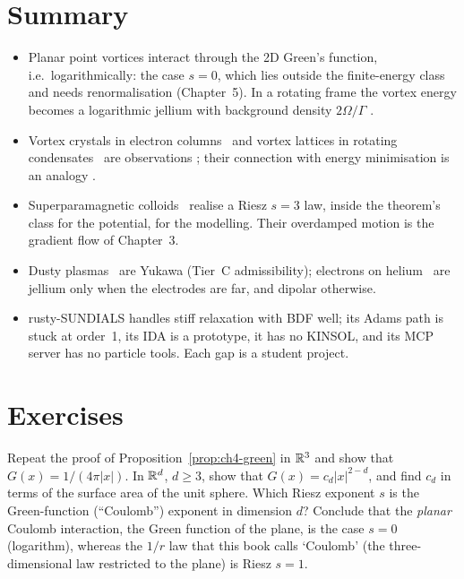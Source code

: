 \section*{Summary}
\begin{itemize}
\item Planar point vortices interact through the 2D Green's function, i.e.\ logarithmically: the case $s=0$, which
lies outside the finite-energy class and needs renormalisation (Chapter~5). In a rotating frame the vortex energy
becomes a logarithmic jellium with background density $2\Omega/\Gamma$ \tierC.
\item Vortex crystals in electron columns~\cite{fine} and vortex lattices in rotating condensates~\cite{aboshaeer}
are observations \tierL; their connection with energy minimisation is an analogy \tierC.
\item Superparamagnetic colloids~\cite{zahn} realise a Riesz $s=3$ law, inside the theorem's class \tierA{} for
the potential, \tierC{} for the modelling. Their overdamped motion is the gradient flow of Chapter~3.
\item Dusty plasmas~\cite{thomas} are Yukawa (Tier~C admissibility); electrons on helium~\cite{grimes} are jellium
only when the electrodes are far, and dipolar otherwise.
\item rusty-SUNDIALS handles stiff relaxation with BDF well; its Adams path is stuck at order~1, its IDA is a
prototype, it has no KINSOL, and its MCP server has no particle tools. Each gap is a student project.
\end{itemize}

\section*{Exercises}

\begin{exercise}\label{ex:ch4-green}
Repeat the proof of Proposition~\ref{prop:ch4-green} in $\mathbb{R}^3$ and show that $G(x)=1/(4\pi|x|)$. In $\mathbb{R}^d$,
$d\ge3$, show that $G(x)=c_d|x|^{2-d}$, and find $c_d$ in terms of the surface area of the unit sphere. Which Riesz
exponent $s$ is the Green-function (``Coulomb'') exponent in dimension $d$? Conclude that the \emph{planar} Coulomb
interaction, the Green function of the plane, is the case $s=0$ (logarithm), whereas the $1/r$ law that this book
calls `Coulomb' (the three-dimensional law restricted to the plane) is Riesz $s=1$.
\end{exercise}

